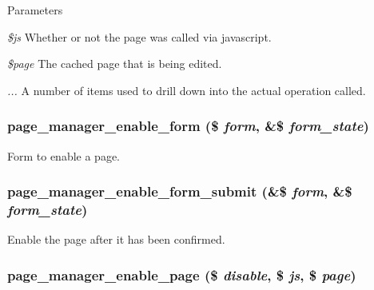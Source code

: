 \begin{DoxyParams}{Parameters}
\item[{\em \$js}]Whether or not the page was called via javascript. \item[{\em \$page}]The cached page that is being edited. \item[{\em ...}]A number of items used to drill down into the actual operation called. \end{DoxyParams}
\hypertarget{page__manager_8admin_8inc_aeff4bbd8d593ad0f6880a9a029b4b7b6}{
\subsubsection[{page\_\-manager\_\-enable\_\-form}]{\setlength{\rightskip}{0pt plus 5cm}page\_\-manager\_\-enable\_\-form (\$ {\em form}, \/  \&\$ {\em form\_\-state})}}
\label{page__manager_8admin_8inc_aeff4bbd8d593ad0f6880a9a029b4b7b6}
Form to enable a page. \hypertarget{page__manager_8admin_8inc_a1a0c114af3f35d42210cfe1bf4af2ca1}{
\subsubsection[{page\_\-manager\_\-enable\_\-form\_\-submit}]{\setlength{\rightskip}{0pt plus 5cm}page\_\-manager\_\-enable\_\-form\_\-submit (\&\$ {\em form}, \/  \&\$ {\em form\_\-state})}}
\label{page__manager_8admin_8inc_a1a0c114af3f35d42210cfe1bf4af2ca1}
Enable the page after it has been confirmed. \hypertarget{page__manager_8admin_8inc_a4199dbaf2894cca0b20bccbd5a9f821b}{
\subsubsection[{page\_\-manager\_\-enable\_\-page}]{\setlength{\rightskip}{0pt plus 5cm}page\_\-manager\_\-enable\_\-page (\$ {\em disable}, \/  \$ {\em js}, \/  \$ {\em page})}}
